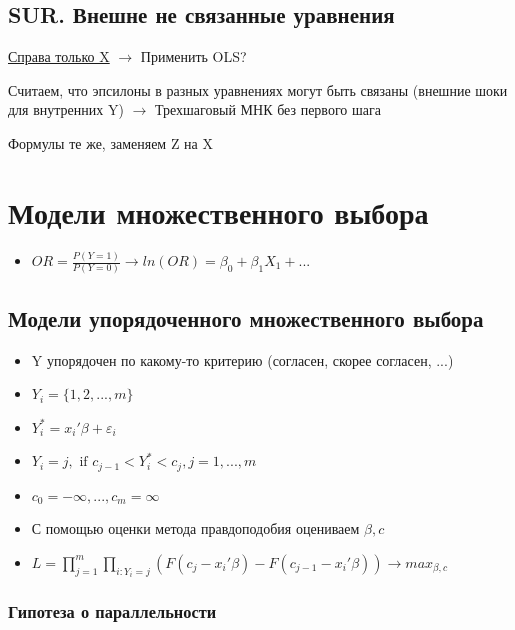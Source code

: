 \documentclass[a4paper, 12pt]{article}
\begin{document}
\subsection{SUR. Внешне не связанные уравнения}

\underline{Справа только X} $\rightarrow$ Применить OLS?
\newline

Считаем, что эпсилоны в разных уравнениях могут быть связаны (внешние шоки для внутренних Y) $\rightarrow$ Трехшаговый МНК без первого шага
\newline

Формулы те же, заменяем Z на X

\section{Модели множественного выбора}

\begin{itemize}
    \item $OR = \frac{P(Y = 1)}{P(Y = 0)} \rightarrow ln(OR) = \beta_{0} + \beta_{1}X_{1} + ...$
\end{itemize}

\subsection{Модели упорядоченного множественного выбора}

\begin{itemize}
    \item Y упорядочен по какому-то критерию (согласен, скорее согласен, ...)
    \item $Y_{i} = \{1, 2, ..., m\}$
    \item $Y_{i}^{*} = x_{i}'\beta + \varepsilon_{i}$
    \item $Y_{i} = j, \textrm{ if } c_{j-1} < Y_{i}^{*} < c_{j}, j = 1, ..., m$
    \item $c_{0} = -\infty, ...,c_{m} = \infty$
    \item С помощью оценки метода правдоподобия оцениваем $\beta, c$
    \item $L = \prod_{j = 1}^{m}\prod_{i: Y_{i} = j}(F(c_{j} - x_{i}'\beta) - F(c_{j-1} - x_{i}'\beta)) \rightarrow max_{\beta, c}$
\end{itemize}

\subsubsection{Гипотеза о параллельности}
\end{document}
